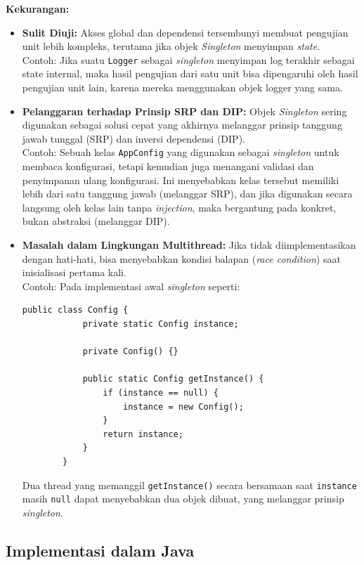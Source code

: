 \textbf{Kekurangan:}
\begin{itemize}
	\item \textbf{Sulit Diuji:} Akses global dan dependensi tersembunyi membuat pengujian unit lebih kompleks, terutama jika objek \textit{Singleton} menyimpan \textit{state}. 
	\\Contoh: Jika suatu \texttt{Logger} sebagai \textit{singleton} menyimpan log terakhir sebagai state internal, maka hasil pengujian dari satu unit bisa dipengaruhi oleh hasil pengujian unit lain, karena mereka menggunakan objek logger yang sama.
	
	\item \textbf{Pelanggaran terhadap Prinsip SRP dan DIP:} Objek \textit{Singleton} sering digunakan sebagai solusi cepat yang akhirnya melanggar prinsip tanggung jawab tunggal (SRP) dan inversi dependensi (DIP).
	\\Contoh: Sebuah kelas \texttt{AppConfig} yang digunakan sebagai \textit{singleton} untuk membaca konfigurasi, tetapi kemudian juga menangani validasi dan penyimpanan ulang konfigurasi. Ini menyebabkan kelas tersebut memiliki lebih dari satu tanggung jawab (melanggar SRP), dan jika digunakan secara langsung oleh kelas lain tanpa \textit{injection}, maka bergantung pada konkret, bukan abstraksi (melanggar DIP).
	
	\item \textbf{Masalah dalam Lingkungan Multithread:} Jika tidak diimplementasikan dengan hati-hati, bisa menyebabkan kondisi balapan (\textit{race condition}) saat inisialisasi pertama kali.
	\\Contoh: Pada implementasi awal \textit{singleton} seperti:
	
	\begin{lstlisting}[style=JavaStyle]
		public class Config {
			private static Config instance;
			
			private Config() {}
			
			public static Config getInstance() {
				if (instance == null) {
					instance = new Config();
				}
				return instance;
			}
		}
	\end{lstlisting}
	
	Dua thread yang memanggil \texttt{getInstance()} secara bersamaan saat \texttt{instance} masih \texttt{null} dapat menyebabkan dua objek dibuat, yang melanggar prinsip \textit{singleton}.
\end{itemize}

\subsection{Implementasi dalam Java}

